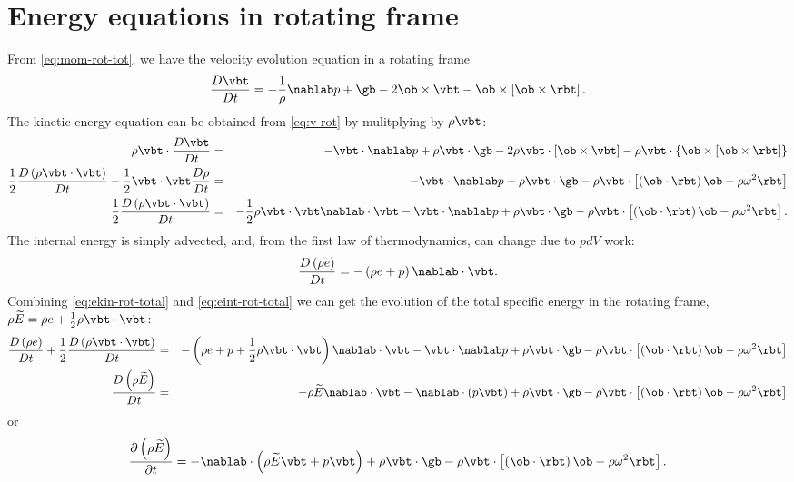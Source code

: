 \section{Energy equations in rotating frame}
From \ref{eq:mom-rot-tot}, we have the velocity evolution equation in
a rotating frame
  \begin{equation}\label{eq:v-rot}
    \frac{D\vbt}{Dt} = -\frac{1}{\rho}\nablab p + \gb - 2\ob\times\vbt - \ob\times\left[\ob\times\rbt\right].
  \end{equation}
The kinetic energy equation can be obtained from \ref{eq:v-rot} by
mulitplying by \(\rho\vbt\):
  \begin{eqnarray}
    \rho\vbt\cdot\frac{D\vbt}{Dt} &=& -\vbt\cdot\nablab p + \rho\vbt\cdot\gb - 2\rho\vbt\cdot\left[\ob\times\vbt\right] - \rho\vbt\cdot\left\{\ob\times\left[\ob\times\rbt\right]\right\} \nonumber \\
    \frac{1}{2}\frac{D\left(\rho\vbt\cdot\vbt\right)}{Dt} - \frac{1}{2}\vbt\cdot\vbt\frac{D\rho}{Dt} &=& -\vbt\cdot\nablab p + \rho\vbt\cdot\gb - \rho\vbt\cdot\left[\left(\ob\cdot\rbt\right)\ob - \rho\omega^2\rbt\right] \nonumber \\
    \frac{1}{2}\frac{D\left(\rho\vbt\cdot\vbt\right)}{Dt} &=& -\frac{1}{2}\rho\vbt\cdot\vbt\nablab\cdot\vbt - \vbt\cdot\nablab p + \rho\vbt\cdot\gb - \rho\vbt\cdot\left[\left(\ob\cdot\rbt\right)\ob - \rho\omega^2\rbt\right]. \label{eq:ekin-rot-total}
  \end{eqnarray}
The internal energy is simply advected, and, from the first law of
thermodynamics, can change due to \(pdV\) work:
  \begin{equation}\label{eq:eint-rot-total}
    \frac{D\left(\rho e\right)}{Dt} = -\left(\rho e + p\right)\nablab\cdot\vbt.
  \end{equation}
Combining \ref{eq:ekin-rot-total} and \ref{eq:eint-rot-total} we can
get the evolution of the total specific energy in the rotating frame,
\(\rho \widetilde{E} = \rho e + \frac{1}{2}\rho\vbt\cdot\vbt\): 
  \begin{eqnarray}
    \frac{D\left(\rho e\right)}{Dt} + \frac{1}{2}\frac{D\left(\rho\vbt\cdot\vbt\right)}{Dt} &=& -\left(\rho e + p + \frac{1}{2}\rho\vbt\cdot\vbt\right)\nablab\cdot\vbt - \vbt\cdot\nablab p + \rho\vbt\cdot\gb -\rho\vbt\cdot\left[\left(\ob\cdot\rbt\right)\ob - \rho\omega^2\rbt\right]\nonumber \\
    \frac{D\left(\rho \widetilde{E}\right)}{Dt} &=& -\rho\widetilde{E}\nablab\cdot\vbt - \nablab\cdot\left(p\vbt\right) + \rho\vbt\cdot\gb - \rho\vbt\cdot\left[\left(\ob\cdot\rbt\right)\ob - \rho\omega^2\rbt\right] \label{eq:etot-rot-total}
  \end{eqnarray}
or
  \begin{equation}\label{eq:etot-rot}
    \frac{\partial\left(\rho\widetilde{E}\right)}{\partial t} = -\nablab\cdot\left(\rho\widetilde{E}\vbt + p\vbt\right) + \rho\vbt\cdot\gb - \rho\vbt\cdot\left[\left(\ob\cdot\rbt\right)\ob - \rho\omega^2\rbt\right].
  \end{equation}


